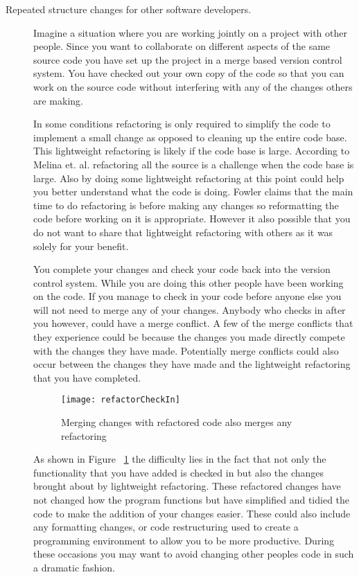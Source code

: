 \begin{description}
\item [Repeated structure changes for other software developers.]
Imagine a situation where you are working jointly on a project with other people. 
Since you want to collaborate on different aspects of the same source code you have set up the project in a merge based version control system.  
You have checked out your own copy of the code so that you can work on the source code without interfering with any of the changes others are making.

In some conditions refactoring is only required to simplify the code to implement a small change as opposed to cleaning up the entire code base.
This lightweight refactoring is likely if the code base is large. 
According to Melina et. al. \cite{Milea2014} refactoring all the source is a challenge when the code base is large. 
Also by doing some lightweight refactoring at this point could help you better understand what the code is doing.
Fowler \cite{Fowler1999} claims that the main time to do refactoring is before making any changes so reformatting the code before working on it is appropriate. 
However it also possible that you do not want to share that lightweight refactoring with others as it was solely for your benefit.

You complete your changes and check your code back into the version control system.  
While you are doing this other people have been working on the code.  
If you manage to check in your code before anyone else you will not need to merge any of your changes.  
Anybody who checks in after you however, could have a merge conflict.  
A few of the merge conflicts that they experience could be because the changes you made directly compete with the changes they have made. 
Potentially merge conflicts could also occur between the changes they have made and the lightweight refactoring that you have completed. 
 

\begin{figure}[!t]
\begin{center}
\texttt{[image: refactorCheckIn]}
\end{center}
\caption{Merging changes with refactored code also merges any refactoring}
\label{fig:motMerge}
\end{figure}

As shown in Figure ~\ref{fig:motMerge} the difficulty lies in the fact that not only the functionality that you have added is checked in but also the changes brought about by lightweight refactoring.  These refactored changes have not changed how the program functions but have simplified and tidied the code to make the addition of your changes easier. These could also include any formatting changes, or code restructuring used to create a programming environment to allow you to be more productive.  During these occasions you may want to avoid changing other peoples code in such a dramatic fashion.


\end{description}
